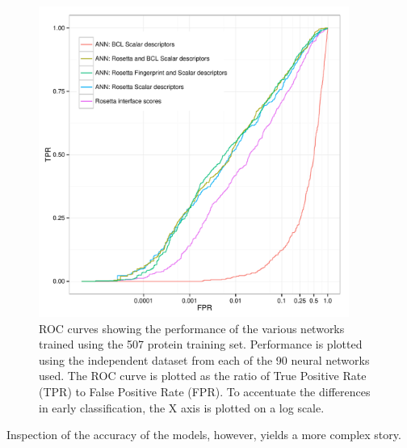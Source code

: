 \begin{figure}
\centering
\includegraphics[width=4in]{figures/hts/tpr_plot.pdf}
\caption{
ROC curves showing the performance of the various networks trained using the 507 protein training set.
Performance is plotted using the independent dataset from each of the 90 neural networks used.
The ROC curve is plotted as the ratio of True Positive Rate (TPR) to False Positive Rate (FPR).
To accentuate the differences in early classification, the X axis is plotted on a log scale.
}
\label{fig:roc_plot}
\end{figure}
\begin{table}
\scriptsize
\renewcommand{\tabcolsep}{0.09cm}
\centering

\caption{
ROC-AUC and average enrichment for the classification models being evaluated.
The Rosetta Interface Scores classifier uses only the sorted RosettaLigand interface scores for classification.
all "ANN" classifiers are constructed as neural nets using the specified descriptors.
ROC-AUC is the area under the ROC curve generated from each descriptor (Figure \ref{fig:roc_plot})
Average enrichment is the average enrichment within the first 1\% of the each dataset.
}
\label{table:ann_performance}
\end{table}

Inspection of the accuracy of the models, however, yields a more complex story. 

